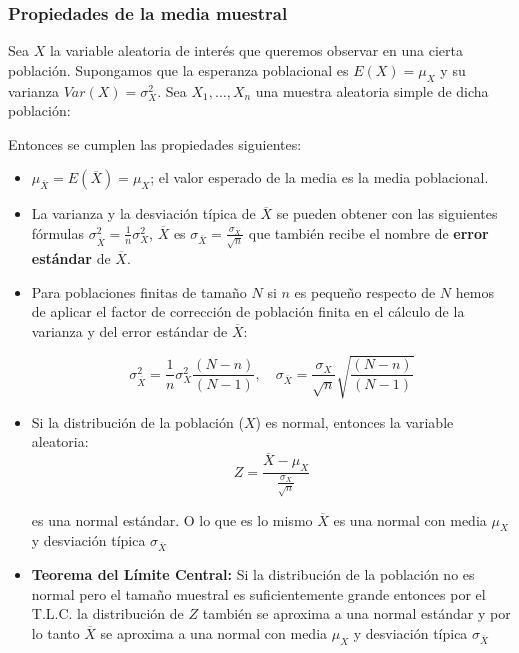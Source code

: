 \begin{frame}
\frametitle{Propiedades de la media muestral}
Sea $X$ la variable aleatoria de interés que queremos observar en  una cierta población. Supongamos que 
 la esperanza poblacional es  $E(X)=\mu_{X}$ y su  varianza $Var(X)=\sigma_{X}^2$. Sea
$X_{1},\ldots, X_{n}$ una muestra aleatoria simple de dicha población:

Entonces se cumplen las propiedades siguientes:

\begin{itemize}
\item $\mu_{\overline{X}}=E(\overline{X})=\mu_{X}$; el valor esperado de la media es la media poblacional.
\item La varianza y la desviación típica de $\overline{X}$ se pueden obtener con las siguientes fórmulas $\sigma_{\overline{X}}^2=\frac{1}{n}\sigma_{X}^2$, $\overline{X}$ es $\sigma_{\overline{X}}=
 \frac{\sigma_{X}}{\sqrt{n}}$
 que también recibe el nombre de \textbf{error estándar} de $\overline{X}$.
\item Para poblaciones finitas de tamaño $N$ si $n$  es pequeño respecto de $N$
hemos de  aplicar el factor de corrección de población finita en
  el cálculo de la varianza y del error estándar de $\overline{X}$:

 $$\sigma_{\overline{X}}^2=\frac{1}{n}\sigma_{X}^2\frac{(N-n)}{(N-1)},\quad
\sigma_{\overline{X}}=\frac{\sigma_{X}}{\sqrt{n}}\sqrt{\frac{(N-n)}{(N-1)}}$$
 
\end{itemize}
\end{frame}

\begin{frame}
\begin{itemize}
\item  Si la distribución de la población ($X$) es normal, entonces
 la variable aleatoria:
 $$Z=\frac{\overline{X}-\mu_{X}}{\frac{\sigma_{X}}{\sqrt{n}}}$$

 es una normal estándar. O lo que es lo mismo $\overline{X}$ es una
 normal con media $\mu_{X}$ y  desviación típica
 $\sigma_{\overline{X}}$
 \item \textbf{Teorema del Límite Central:} Si la distribución de la población no es normal pero el tamaño
 muestral es suficientemente grande entonces por el T.L.C.
 la distribución de $Z$ también se aproxima a una normal estándar y
 por lo tanto $\overline{X}$ se aproxima a una
 normal con media $\mu_{X}$ y  desviación típica
 $\sigma_{\overline{X}}$
\end{itemize}
\end{frame}

